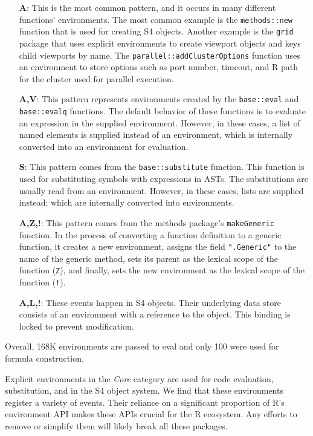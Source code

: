 \documentclass[10pt,review,sigplan,authorversion=true]{acmart}
\renewcommand{\c}[1]{\lstinline |#1|\xspace}
\begin{document}
\begin{itemize}
\item[{\bf A}:]
  This is the most common pattern, and it occurs in many different
functions' environments. The most common example is the \c{methods::new}
function that is used for creating S4 objects. Another example is the
\c{grid} package that uses explicit environments to create viewport objects
and keys child viewports by name. The \c{parallel::addClusterOptions} function
uses an environment to store options such as port number, timeout, and R path
for the cluster used for parallel execution.
\item[{\bf A,V}:]
This pattern represents environments created by the
\c{base::eval} and \c{base::evalq} functions. The default behavior of
these functions is to evaluate an expression in the supplied environment.
However, in these cases, a list of named elements is supplied instead of an
environment, which is internally converted into an environment for evaluation.
\item[{\bf S}:]
This pattern comes from the \c{base::substitute} function. This
function is used for substituting symbols with expressions in ASTs. The
substitutions are usually read from an environment. However, in these cases,
lists are supplied instead; which are internally converted into environments.
\item[{\bf A,Z,!}:]
This pattern comes from the methods package's
\c{makeGeneric} function. In the process of converting a function definition
to a generic function, it creates a new environment, assigns the field
\c{".Generic"} to the name of the generic method, sets its parent as the
lexical scope of the function (\texttt{Z}), and finally, sets the new
environment as the lexical scope of the function (\texttt{!}).
\item[{\bf A,L,!}:]
These events happen in S4 objects. Their underlying data store
consists of an environment with a reference to the object. This binding is
locked to prevent modification.
\end{itemize}

Overall, 168K environments are passed to eval and only 100 were used for formula
construction.

Explicit environments in the \emph{Core} category are used for code evaluation,
substitution, and in the S4 object system. We find that these environments
register a variety of events. Their reliance on a significant proportion of R's
environment API makes these APIs crucial for the R ecosystem. Any efforts to
remove or simplify them will likely break all these packages.
\end{document}
